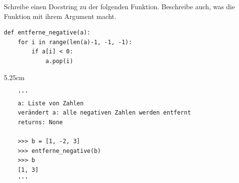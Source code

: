 \question[3]
Schreibe einen Docstring zu der folgenden Funktion. Beschreibe auch, was die Funktion mit ihrem Argument macht.
\begin{lstlisting}
def entferne_negative(a):
    for i in range(len(a)-1, -1, -1):
        if a[i] < 0:
            a.pop(i)
\end{lstlisting}
\begin{solutionbox}{5.25cm}
\begin{lstlisting}
    '''
    a: Liste von Zahlen
    verändert a: alle negativen Zahlen werden entfernt
    returns: None

    >>> b = [1, -2, 3]
    >>> entferne_negative(b)
    >>> b
    [1, 3]
    '''
\end{lstlisting}
\end{solutionbox}

